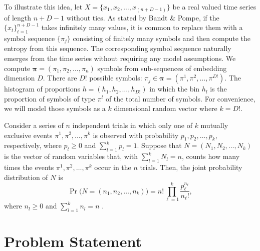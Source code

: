 To illustrate this idea, let $X=\{x_1,x_2, \dots, x_{(n+D-1)}\}$ 
be a real valued time series of length $n+D-1$ without ties. 
As stated by Bandt \& Pompe, if the $\{x_t\}_{t=1}^{n+D-1}$ takes infinitely many values, it is common to replace them with a symbol sequence $\{{\pi}_j\}$
consisting of finitely many symbols and then compute the entropy from this sequence. 
The corresponding symbol sequence naturally emerges from the time series without requiring any model assumptions. We compute
$\mathbf{{\pi}}=({\pi}_1, {\pi}_2,\dots, {\pi}_n)$ symbols from sub-sequences of embedding dimension $D$. 
There are $D!$ possible symbols: $\pi_j \in \mathbf{{\pi}}=({\pi}^1, {\pi}^2,\dots, {\pi}^{D!})$. 
The histogram of proportions $h=(h_1,h_2,\dots, h_{D!})$ in which the bin $h_l$ 
is the proportion of symbols of type $\pi^l$ of the total number of symbols. 
For convenience, we will model those symbols as a $k$ dimensional random vector where $k=D!$.

Consider a series of $n$ independent trials in which only one of $k$ mutually exclusive events ${\pi}^1, {\pi}^2,\dots, {\pi}^k$ is observed with probability $p_1, p_2, \dots, p_k,$ respectively, where $p_l \geq 0$ and $\sum_{l=1}^{k} p_l=1.$ Suppose that $N=(N_1, N_2, \dots, N_k)$ is the vector of random variables that, with $\sum_{l=1}^{k} N_l=n$, counts how many times the events ${\pi}^1, {\pi}^2,\dots, {\pi}^k$ occur in the $n$ trials. Then, the joint probability distribution of $N$ is
\begin{equation}
	\Pr\big(N=(n_1,n_2,\dots, n_k)\big) = n! \prod_{\ell=1}^{k} \frac{p_\ell^{n_\ell}}{n_\ell !}, %
\end{equation}    
where $n_l \geq 0$ and $\sum_{l=1}^{k} n_l=n$ .


\section*{Problem Statement}

